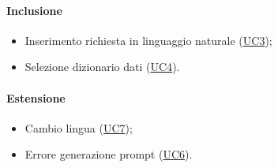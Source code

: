 \paragraph*{Inclusione}
\begin{itemize}
  \item Inserimento richiesta in linguaggio naturale (\hyperref[UC3]{UC3});
  \item Selezione dizionario dati (\hyperref[UC4]{UC4}).
\end{itemize}

\paragraph*{Estensione}
\begin{itemize}
  \item Cambio lingua (\hyperref[UC7]{UC7});
  \item Errore generazione prompt (\hyperref[UC6]{UC6}).
\end{itemize}
